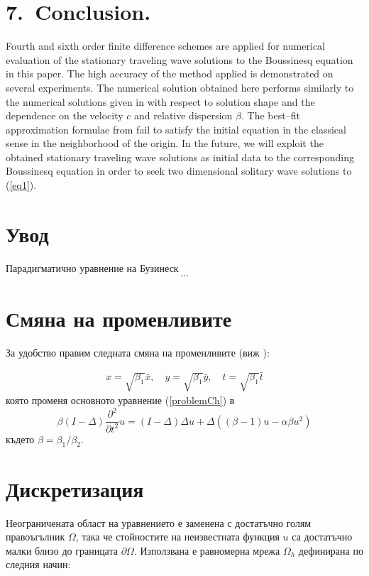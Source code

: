 \documentclass{article}
\newcommand{\be}{\begin{equation}}
\newcommand{\ee}{\end{equation}}
\newcommand{\rf}[1]{(\ref{#1})}
\begin{document}
\bigskip

\section{7.~Conclusion.}
Fourth and sixth order finite difference schemes are applied for numerical evaluation of the stationary traveling wave solutions to the Boussinesq equation in this paper. The high accuracy of the method applied is demonstrated on several experiments. The numerical solution obtained here performs similarly to the numerical solutions given in \cite{Ch2012,Ch2011} with respect to solution shape and the dependence on the velocity $c$ and relative dispersion $\beta$. 
The best--fit approximation formulae from  \cite{Ch2011} fail to satisfy the initial equation in the classical sense in the neighborhood of the origin. 
In the future, we will exploit the obtained stationary traveling wave solutions as initial data to the corresponding Boussinesq equation in order to seek two dimensional solitary wave solutions to \rf{eq1}.

\bigskip

\fi


\section{Увод}
Парадигматично уравнение на Бузинеск
\be\label{problemCh}
...
\ee


\section{Смяна на променливите}

За удобство правим следната смяна на променливите (виж \cite{ref25}):

\begin{align}
x = \sqrt{\beta_1} \bar{x}, \quad y = \sqrt{\beta_1} \bar{y}, \quad t = \sqrt{\beta_1} \bar{t} \nonumber
\end{align}
която променя основното уравнение \rf{problemCh} в
\be\label{problemVC}
 \beta (I-\Delta) \frac{\partial^2}{\partial t^2}u= 
(I-\Delta)\Delta u +\Delta( (\beta - 1 )u - \alpha \beta u^2 )
\ee
където $\beta = \beta_1/\beta_2$. 

\section{Дискретизация}
Неограничената област на уравнението е заменена с достатъчно голям правоъгълник $\Omega$, така че стойностите на неизвестната функция $u$ са достатъчно малки близо до границата $\partial \Omega$. Използвана е равномерна мрежа  $\Omega_h$ дефинирана по следния начин:
\end{document}
